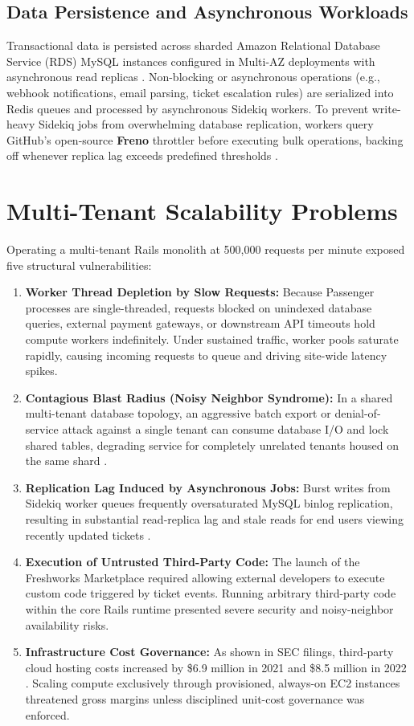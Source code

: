 \documentclass[10pt,a4paper]{article}
\begin{document}
\subsection{Data Persistence and Asynchronous Workloads}
Transactional data is persisted across sharded Amazon Relational Database Service (RDS) MySQL instances configured in Multi-AZ deployments with asynchronous read replicas \cite{fw_scale_2020}. Non-blocking or asynchronous operations (e.g., webhook notifications, email parsing, ticket escalation rules) are serialized into Redis queues and processed by asynchronous Sidekiq workers. To prevent write-heavy Sidekiq jobs from overwhelming database replication, workers query GitHub's open-source \textbf{Freno} throttler before executing bulk operations, backing off whenever replica lag exceeds predefined thresholds \cite{fw_freno}.

\section{Multi-Tenant Scalability Problems}
Operating a multi-tenant Rails monolith at 500,000 requests per minute exposed five structural vulnerabilities:
\begin{enumerate}
    \item \textbf{Worker Thread Depletion by Slow Requests:} Because Passenger processes are single-threaded, requests blocked on unindexed database queries, external payment gateways, or downstream API timeouts hold compute workers indefinitely. Under sustained traffic, worker pools saturate rapidly, causing incoming requests to queue and driving site-wide latency spikes.
    \item \textbf{Contagious Blast Radius (Noisy Neighbor Syndrome):} In a shared multi-tenant database topology, an aggressive batch export or denial-of-service attack against a single tenant can consume database I/O and lock shared tables, degrading service for completely unrelated tenants housed on the same shard \cite{fw_sreconf_2023}.
    \item \textbf{Replication Lag Induced by Asynchronous Jobs:} Burst writes from Sidekiq worker queues frequently oversaturated MySQL binlog replication, resulting in substantial read-replica lag and stale reads for end users viewing recently updated tickets \cite{fw_freno}.
    \item \textbf{Execution of Untrusted Third-Party Code:} The launch of the Freshworks Marketplace required allowing external developers to execute custom code triggered by ticket events. Running arbitrary third-party code within the core Rails runtime presented severe security and noisy-neighbor availability risks.
    \item \textbf{Infrastructure Cost Governance:} As shown in SEC filings, third-party cloud hosting costs increased by \$6.9 million in 2021 and \$8.5 million in 2022 \cite{sec_10k_2021, sec_10k_2022}. Scaling compute exclusively through provisioned, always-on EC2 instances threatened gross margins unless disciplined unit-cost governance was enforced.
\end{enumerate}
\end{document}
